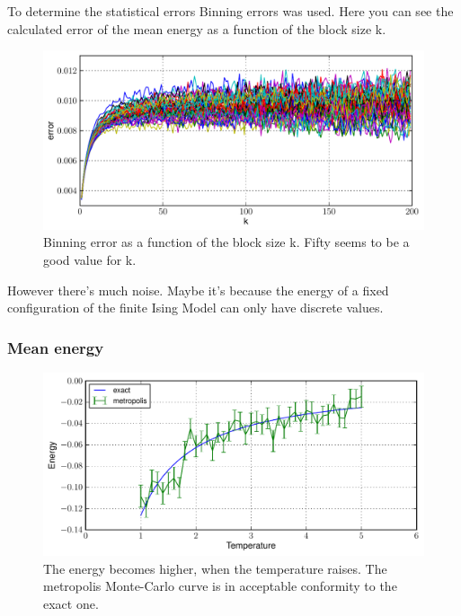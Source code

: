 \documentclass[12pt,a4paper]{scrartcl}
\begin{document}
To determine the statistical errors Binning errors was used. Here you can see the calculated error of the mean energy as a function of the block size k.

\begin{figure}[H]
\includegraphics[width=14.0cm]{../plots/ising_06.pdf}
\caption{Binning error as a function of the block size k. Fifty seems to be a good value for k.}
\end{figure}

However there's much noise. Maybe it's because the energy of a fixed configuration of the finite Ising Model can only have discrete values.

\subsubsection{Mean energy}
\begin{figure}[H]
\includegraphics[width=14.0cm]{../plots/ising_01.pdf}
\caption{The energy becomes higher, when the temperature raises. The metropolis Monte-Carlo curve is in acceptable conformity to the exact one.}
\end{figure}
\end{document}

